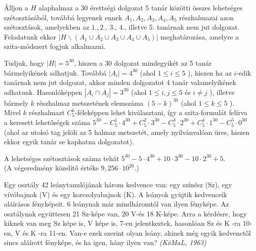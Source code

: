 \begin{solution}
Álljon a $H$ alaphalmaz a 30 érettségi dolgozat 5 tanár közötti összes
lehetséges szétosztásából, továbbá legyenek ennek $A_{1},A_{2},A_{3},A_{4},A_{5}$
részhalmazai azon szétosztások, amelyekben az $1.,2$., 3., 4., illetve
5. tanárnak nem jut dolgozat. Feladatunk ekkor $\left|H\backslash\left(A_{1}\cup A_{2}\cup A_{3}\cup A_{4}\cup A_{5}\right)\right|$
meghatározása, amelyre a szita-módszert fogjuk alkalmazni.

Tudjuk, hogy $|H|=5^{30}$, hiszen a 30 dolgozat mindegyikét az 5
tanár bármelyikének adhatjuk. Továbbá $\left|A_{i}\right|=4^{30}$
(ahol $1\leq i\leq5$ ), hiszen ha az $i$-edik tanárnak nem jut dolgozat,
akkor minden dolgozatot 4 tanár valamelyikének adhatunk. Hasonlóképpen
$\left|A_{i}\cap A_{j}\right|=3^{30}$ (ahol $1\leq i,j\leq5$ és
$i\neq j$ ), illetve bármely $k$ részhalmaz metszetének elemszáma
$(5-k)^{30}$ (ahol $1\leq k\leq5$ ). Mivel $k$ részhalmazt $C_{5}^{k}$-féleképpen
lehet kiválasztani, így a szita-formulát felírva a keresett lehetőségek
száma $5^{30}-C_{5}^{1}\cdot4^{30}+C_{5}^{2}\cdot3^{30}-C_{5}^{3}\cdot2^{30}+C_{5}^{4}\cdot1^{30}-C_{5}^{5}\cdot0^{30}$
(ahol az utolsó tag jelöli az 5 halmaz metszetét, amely nyilvánvalóan
üres, hiszen ekkor egyik tanár se kaphatna dolgozatot).

A lehetséges szétosztások száma tehát $5^{30}-5\cdot4^{30}+10\cdot3^{30}-10\cdot2^{30}+5$.\\
 (A végeredmény közelítő értéke $9,256\cdot10^{20}$.)
\end{solution}
\begin{extraproblem}
Egy osztály 42 leánytanulójának három kedvence van: egy színész (Sz),
egy vívóbajnok (V) és egy korcsolyabajnok (K). A leányok gyüjtik kedvenceik
aláírásos fényképeit. 6 leánynak már mindháromtól van ilyen fényképe.
Az osztálynak együttesen 21 Sz-képe van, 20 V-és 18 K-képe. Arra a
kérdésre, hogy kiknek van meg Sz képe is, V képe is, 7-en jelentkeztek,
hasonlóan Sz és K -ra 10-en, V és K -ra 11-en. Van-e ezek szerint
olyan leány, akinek még egyik kedvenctől sincs aláírott fényképe,
és ha igen, hány ilyen van? \emph{(KöMaL, 1963) }
\end{extraproblem}

